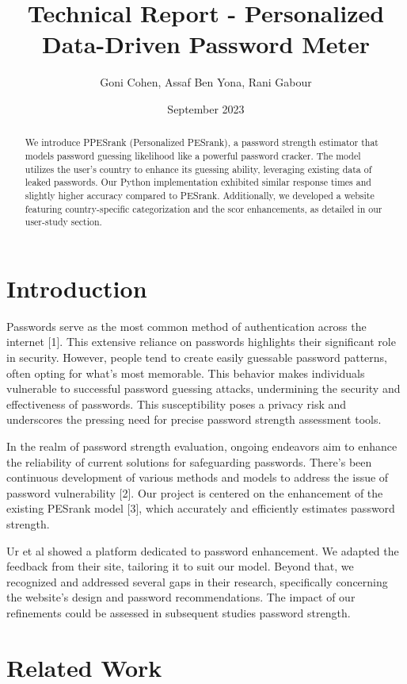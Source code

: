 \documentclass[5p,twocolumn]{elsarticle}
\title{Technical Report - Personalized Data-Driven Password Meter}
\author{Goni Cohen, Assaf Ben Yona, Rani Gabour}
\date{September 2023}
\begin{document}
\begin{abstract}
We introduce PPESrank (Personalized PESrank), a password strength estimator that models password guessing likelihood like a powerful password cracker. The model utilizes the user's country to enhance its guessing ability, leveraging existing data of leaked passwords. Our Python implementation exhibited similar response times and slightly higher accuracy compared to PESrank. Additionally, we developed a website featuring country-specific categorization and the scor enhancements, as detailed in our user-study section.

\end{abstract}
\maketitle
\section{Introduction}
\label{introduction}
Passwords serve as the most common method of authentication across the internet [1]. This extensive reliance on passwords highlights their significant role in security. However, people tend to create easily guessable password patterns, often opting for what's most memorable. This behavior makes individuals vulnerable to successful password guessing attacks, undermining the security and effectiveness of passwords. This susceptibility poses a privacy risk and underscores the pressing need for precise password strength assessment tools.

In the realm of password strength evaluation, ongoing endeavors aim to enhance the reliability of current solutions for safeguarding passwords. There's been continuous development of various methods and models to address the issue of password vulnerability [2]. Our project is centered on the enhancement of the existing PESrank model [3], which accurately and efficiently estimates password strength.

Ur et al showed a platform dedicated to password enhancement. We adapted the feedback from their site, tailoring it to suit our model. Beyond that, we recognized and addressed several gaps in their research, specifically concerning the website's design and password recommendations. The impact of our refinements could be assessed in subsequent studies password strength.
\section{Related Work}
\label{Related Work}
\end{document}
